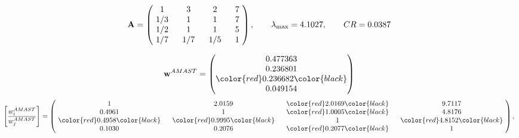 \begin{example}
\begin{equation*}
\mathbf{A} =
\begin{pmatrix}
$\,\,$ 1 $\,\,$ & $\,\,$3$\,\,$ & $\,\,$2$\,\,$ & $\,\,$7 $\,\,$ \\
$\,\,$ 1/3$\,\,$ & $\,\,$ 1 $\,\,$ & $\,\,$1$\,\,$ & $\,\,$7 $\,\,$ \\
$\,\,$ 1/2$\,\,$ & $\,\,$ 1 $\,\,$ & $\,\,$ 1 $\,\,$ & $\,\,$5 $\,\,$ \\
$\,\,$ 1/7$\,\,$ & $\,\,$ 1/7$\,\,$ & $\,\,$ 1/5$\,\,$ & $\,\,$ 1  $\,\,$ \\
\end{pmatrix},
\qquad
\lambda_{\max} =
4.1027,
\qquad
CR = 0.0387
\end{equation*}

\begin{equation*}
\mathbf{w}^{AMAST} =
\begin{pmatrix}
0.477363\\
0.236801\\
\color{red} 0.236682\color{black} \\
0.049154
\end{pmatrix}\end{equation*}
\begin{equation*}
\left[ \frac{{w}^{AMAST}_i}{{w}^{AMAST}_j} \right] =
\begin{pmatrix}
$\,\,$ 1 $\,\,$ & $\,\,$2.0159$\,\,$ & $\,\,$\color{red} 2.0169\color{black} $\,\,$ & $\,\,$9.7117$\,\,$ \\
$\,\,$0.4961$\,\,$ & $\,\,$ 1 $\,\,$ & $\,\,$\color{red} 1.0005\color{black} $\,\,$ & $\,\,$4.8176  $\,\,$ \\
$\,\,$\color{red} 0.4958\color{black} $\,\,$ & $\,\,$\color{red} 0.9995\color{black} $\,\,$ & $\,\,$ 1 $\,\,$ & $\,\,$\color{red} 4.8152\color{black}  $\,\,$ \\
$\,\,$0.1030$\,\,$ & $\,\,$0.2076$\,\,$ & $\,\,$\color{red} 0.2077\color{black} $\,\,$ & $\,\,$ 1  $\,\,$ \\
\end{pmatrix},
\end{equation*}


\end{example}
